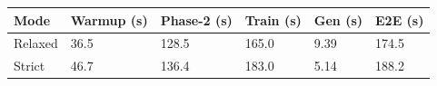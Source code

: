 \begin{tabular}{llllll}
\toprule
Mode & Warmup (s) & Phase-2 (s) & Train (s) & Gen (s) & E2E (s) \\
\midrule
Relaxed & 36.5 & 128.5 & 165.0 & 9.39 & 174.5 \\
Strict & 46.7 & 136.4 & 183.0 & 5.14 & 188.2 \\
\bottomrule
\end{tabular}

